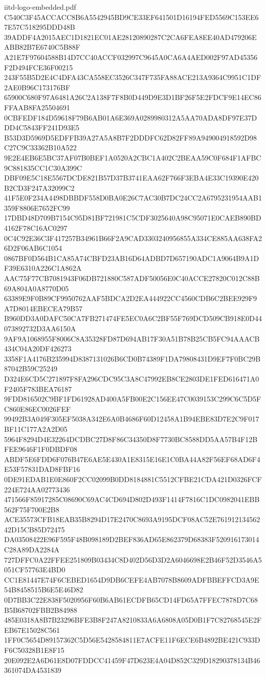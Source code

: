 \begin{filecontents*}[overwrite]{iitd-logo-embedded.pdf}
C540C3F45ACCACC8B6A5542945BD9CE33EF641501D16194FED5569C153EE67E57C518295DDD48B
39ADDF4A2015AEC1D1821EC01AE28120890287C2CA6FEA8EE40AD479206EABB82B7E6740C5B88F
A21E7F97604588B14D7CC40ACCF032997C9645A0CA6A4AED002F97AD45356F2D494FCE36F00215
243F55B5D2E4C4DFA43CA558EC3526C347F735FA88ACE213A9364C9951C1DF2AE0B96C173176BF
65900C680F97A6481A26C2A138F7F8B0D449D9E3D1BF26F5E2FDCF9E14EC86FFAAB8FA25504691
0CBFEDF184D59618F79B6AB01A6E369A0289980312A5AA70ADA8DF97E37DDD4C5843FF241D93E5
B53D3D5969D5EDFFB39A27A5A8B7F2DDDFC62D82FF89A949004918592D98C27C9C33362B10A522
9E2E4EB6E5BC37AF07B0BEF1A0520A2CBC1A402C2BEAA59C0F684F1AFBC9C881835CC1C30A399C
DBF09E5C18E5567DCDE821B57D37B3741EAA62F766F3EBA4E33C19390E420B2CD3F247A32099C2
41F5E0F234A4498DBBDF558D0BA0E26C7AC30B7DC24CC2A6795231954AAB1359F8806E7652FC99
17DBD48D709B7154C95D81BF721981C5CDF3025640A98C95071E0CAEB890BD4162F78C16AC0297
0C4C92E36C3F417257B34961B66F2A9CAD3303240956855A334CE885AA638FA26D2F06AB6C1054
0867BF0D564B1CA85A74CBFD23AB16D64ADBD7D657190ADC1A9064B9A1DF39E6310A226C1A862A
AAC75F77CB7081943F06DB721880C587ADF50056E0C40ACCE27820C012C88B69A804A0A8770D05
63389E9F0B89CF9950762AAF5BDCA2D2EA444922CC4560CDB6C2BEE929F9A7D8014EBECEA79B57
B960DD3A0DAFC50CA7FB271474FE5EC0A6C2BF55F769DCD509CB918E0D44073892732D3AA6150A
9AF9A1068955F8006C8A35328FD87D694AB17F30A51B78B25CB5FC94AAACB434C04A20DF426273
3358F1A4176B235994D8387131026B6CD0B74389F1DA79808431D9EF7F0BC29B87042B59C25249
D324E6CD5C271897F8FA296CDC95C3A8C47992EB8CE2803DE1FED616471A0F2405F783BEA76187
9FDD816502C9BF1FD61928AD400A5FB00E2C156EE47C0039153C299C6C5D5FC860E86EC0026FEF
99492B3A049F305EF5038A342E6A0B4686F60D12458A1B94EBE83D7E2C9F017BF11C177A2A2D05
5964F8294D4E32264DCDBC27D8F86C34350D8F7730BC8588DD5AA57B4F12BFEE9646F1F0DBDF08
ABDF5E6FDD6F076B47E6AE5E430A1E8315E16E1C0BA44A82F56EF68AD6F4E53F57831DAD8FBF16
0DE91EDAB1E0E860F2CC02099B0DD8184881C5512CFBE21CDA421D0326FCF224E724AA02773436
471566F85917285C08690C69AC4CD694D802D493F1414F7816C1DC0982041EBB562F75F700E2B8
ACE35573CFB18EAB35B8294D17E2470C8693A9195DCF08AC52E76191213456242D15CB85D72475
DA03508422E96F595F48B098189D2BEF836AD65E862379D68383F520916173014C28A89DA2284A
727DFFC0A22FFEE251809B03434C8D402D56D3D2A6046698E2B46F52D3546A5051CF57763E4BD0
CC1E81447E74F6CEBED1654D9DB6CEFE4AB7078B8609ADFBBEFFCD3A9E54B8458515B6E5E46D82
0D7BB3C22E838F5020956F60B6AB61ECDFB65CD14FD65A7FFEC7878D7C68B5B68702FBB2B84988
485E0318A8B7B23296BFE3B8F247A8210833A6A6808A05D0B1F7C82768545E2FEB67E15028C561
1FF0C5654D89157362C5D56E5428584811E7ACFE11F6ECE6B4892BE421C933DF6C50328B1E8F15
20E092E2A6D61E8D07FDDCC41459F47D623E4A04D852C329D18290378134B46361074DA4531839

\end{filecontents*}
